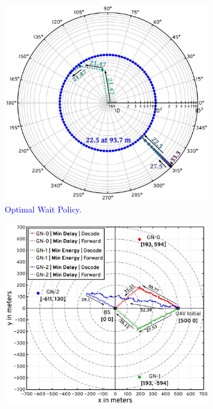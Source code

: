 \documentclass[12pt, draftcls, onecolumn]{IEEEtran}
\theoremstyle{plain}
\theoremstyle{definition}
\theoremstyle{remark}
\newcommand\hlt[1]{\textcolor{blue}{#1}}
\begin{document}
\begin{figure} [t]
    \begin{subfigure}{0.485\linewidth}
      \centering
      \includegraphics[width=1.0\linewidth]{figs/Waiting_Policy_10Mb.jpeg}
      \caption{\hlt{Optimal Wait Policy.}}
      \label{F6}
    \end{subfigure}
    \hfill
    \begin{subfigure}{0.515\linewidth}
      \centering
      \includegraphics[width=1.0\linewidth]{figs/HCSO_Trajectories_Updated.jpeg}

\end{subfigure}
\end{figure}
\end{document}
